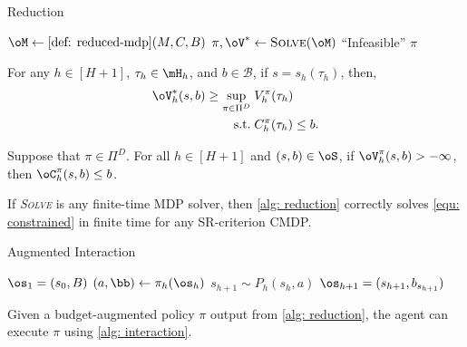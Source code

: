 \documentclass[pdftex, a4paper, 12pt]{article}
\newcommand{\mB}{\mathcal{B}}
\begin{document}
\begin{algorithm}[t]
    \caption{Reduction}\label{alg: reduction}
    \begin{algorithmic}[1]
        \State $\oM \gets \text{\cref{def: reduced-mdp}}(M, C, B)$
        \State $\pi, \oV^* \gets \textsc{Solve}(\oM)$
        \If{$\oV^* = -\infty$}
            \State \Return ``Infeasible''
        \Else 
            \State \Return $\pi$ 
        \EndIf
    \end{algorithmic}
\end{algorithm}

\begin{lemma}[Value]\label{lem: value}
    For any $h \in [H+1]$, $\tau_h \in \mH_h$, and $b \in \mB$, if $s = s_h(\tau_h)$, then,
    \begin{equation}\label{equ: val-lemma}
        \begin{split}
            \oV_h^*(s,b) \geq \sup_{\pi \in \Pi^D}&\; V_h^{\pi}(\tau_h) \\
            \text{s.t.}&\; C_h^{\pi}(\tau_h) \leq b.
        \end{split}
    \end{equation}
\end{lemma}

\begin{lemma}[Cost]\label{lem: cost}
    Suppose that $\pi \in \Pi^D$. For all $h \in [H+1]$ and $(s,b) \in \oS$, if $\oV^{\pi}_h(s,b) > -\infty$, then $\oC^{\pi}_{h}(s,b) \leq b$. 
\end{lemma}


\begin{theorem}[Reduction]\label{thm: reduction}
    If \emph{\textsc{Solve}} is any finite-time MDP solver, then \cref{alg: reduction} correctly solves \eqref{equ: constrained} in finite time for any SR-criterion CMDP.
\end{theorem}

\begin{algorithm}[t]
    \caption{Augmented Interaction}\label{alg: interaction}
    \begin{algorithmic}[1]
        \Require{$\pi$}
        \State $\os_1 = (s_0, B)$ 
            \State $(a, \bb) \gets \pi_h(\os_h)$
            \State $s_{h+1} \sim P_h(s_h,a)$ 
            \State $\os_{h+1} = (s_{h+1}, b_{s_{h+1}})$
        \EndFor
    \end{algorithmic}
\end{algorithm}

\begin{remark}[Deployment]\label{rem: execution}
    Given a budget-augmented policy $\pi$ output from \cref{alg: reduction}, the agent can execute $\pi$ using \cref{alg: interaction}. 
\end{remark}
\end{document}

